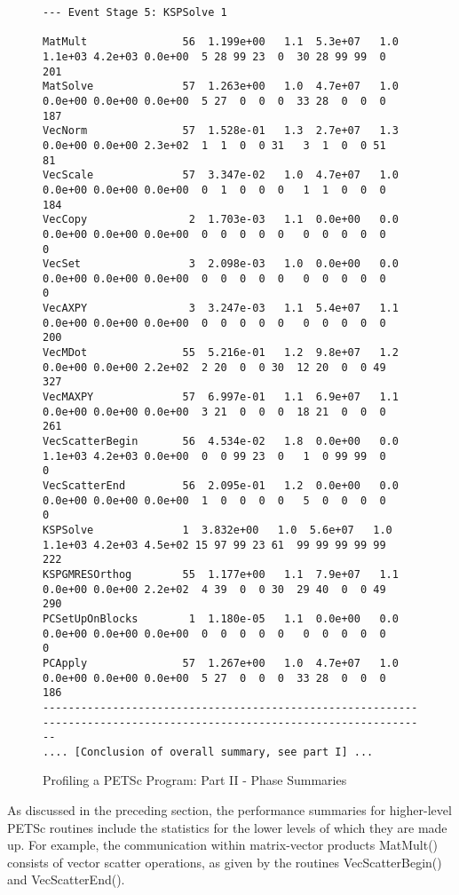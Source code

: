\begin{figure}[tb]
{\begin{verbatim}
--- Event Stage 5: KSPSolve 1

MatMult               56  1.199e+00   1.1  5.3e+07   1.0  1.1e+03 4.2e+03 0.0e+00  5 28 99 23  0  30 28 99 99  0   201
MatSolve              57  1.263e+00   1.0  4.7e+07   1.0  0.0e+00 0.0e+00 0.0e+00  5 27  0  0  0  33 28  0  0  0   187
VecNorm               57  1.528e-01   1.3  2.7e+07   1.3  0.0e+00 0.0e+00 2.3e+02  1  1  0  0 31   3  1  0  0 51    81
VecScale              57  3.347e-02   1.0  4.7e+07   1.0  0.0e+00 0.0e+00 0.0e+00  0  1  0  0  0   1  1  0  0  0   184
VecCopy                2  1.703e-03   1.1  0.0e+00   0.0  0.0e+00 0.0e+00 0.0e+00  0  0  0  0  0   0  0  0  0  0     0
VecSet                 3  2.098e-03   1.0  0.0e+00   0.0  0.0e+00 0.0e+00 0.0e+00  0  0  0  0  0   0  0  0  0  0     0
VecAXPY                3  3.247e-03   1.1  5.4e+07   1.1  0.0e+00 0.0e+00 0.0e+00  0  0  0  0  0   0  0  0  0  0   200
VecMDot               55  5.216e-01   1.2  9.8e+07   1.2  0.0e+00 0.0e+00 2.2e+02  2 20  0  0 30  12 20  0  0 49   327
VecMAXPY              57  6.997e-01   1.1  6.9e+07   1.1  0.0e+00 0.0e+00 0.0e+00  3 21  0  0  0  18 21  0  0  0   261
VecScatterBegin       56  4.534e-02   1.8  0.0e+00   0.0  1.1e+03 4.2e+03 0.0e+00  0  0 99 23  0   1  0 99 99  0     0
VecScatterEnd         56  2.095e-01   1.2  0.0e+00   0.0  0.0e+00 0.0e+00 0.0e+00  1  0  0  0  0   5  0  0  0  0     0
KSPSolve              1  3.832e+00   1.0  5.6e+07   1.0  1.1e+03 4.2e+03 4.5e+02 15 97 99 23 61  99 99 99 99 99   222
KSPGMRESOrthog        55  1.177e+00   1.1  7.9e+07   1.1  0.0e+00 0.0e+00 2.2e+02  4 39  0  0 30  29 40  0  0 49   290
PCSetUpOnBlocks        1  1.180e-05   1.1  0.0e+00   0.0  0.0e+00 0.0e+00 0.0e+00  0  0  0  0  0   0  0  0  0  0     0
PCApply               57  1.267e+00   1.0  4.7e+07   1.0  0.0e+00 0.0e+00 0.0e+00  5 27  0  0  0  33 28  0  0  0   186
------------------------------------------------------------------------------------------------------------------------
.... [Conclusion of overall summary, see part I] ...
\end{verbatim}
}
\caption{Profiling a PETSc Program: Part II - Phase Summaries}
\label{fig_exparprof2}
\end{figure}

As discussed in the preceding section, the performance summaries for
higher-level PETSc routines include the statistics for the lower
levels of which they are made up.  For example, the communication within
matrix-vector products MatMult() consists of vector scatter
operations, as given by the routines VecScatterBegin() and VecScatterEnd().
%
%

